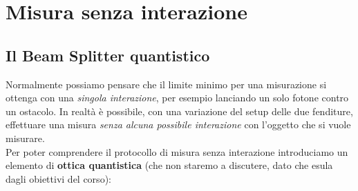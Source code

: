 \documentclass[../../InformazioneQuantistica.tex]{subfiles}
\begin{document}
\section{Misura senza interazione}

\subsection{Il Beam Splitter quantistico}
Normalmente possiamo pensare che il limite minimo per una misurazione si ottenga con una \textit{singola interazione}, per esempio lanciando un solo fotone contro un ostacolo. In realtà è possibile, con una variazione del setup delle due fenditure, effettuare una misura \textit{senza alcuna possibile interazione} con l'oggetto che si vuole misurare.\\

Per poter comprendere il protocollo di misura senza interazione introduciamo un elemento di \textbf{ottica quantistica} (che non staremo a discutere, dato che esula dagli obiettivi del corso):
\end{document}
